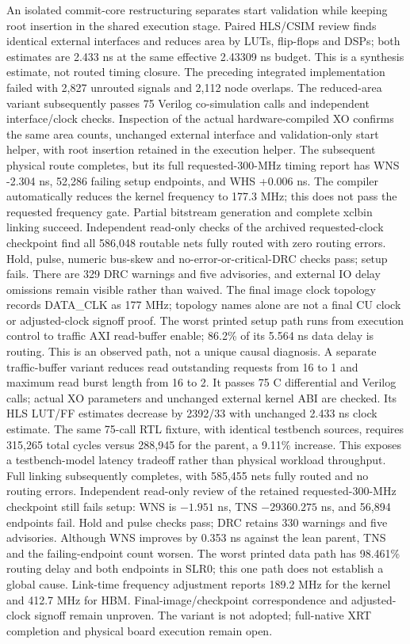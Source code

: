 \documentclass[10pt]{article}
\begin{document}
An isolated commit-core restructuring separates start validation while
keeping root insertion in the shared execution stage. Paired HLS/CSIM
review finds identical external interfaces and reduces area by
\LeanStartLUTDelta{} LUTs, \LeanStartFFDelta{} flip-flops and
\LeanStartDSPDelta{} DSPs; both estimates are 2.433 ns at the same effective
2.43309 ns budget. This is a synthesis estimate, not routed timing closure.
The preceding integrated implementation failed with 2,827 unrouted signals
and 2,112 node overlaps. The reduced-area variant subsequently passes
75 Verilog co-simulation calls and independent interface/clock checks.
Inspection of the actual hardware-compiled XO confirms the same area counts,
unchanged external interface and validation-only start helper, with root
insertion retained in the execution helper. The subsequent physical route
completes, but its full requested-300-MHz timing report has WNS -2.304 ns,
52,286 failing setup endpoints, and WHS +0.006 ns. The compiler automatically
reduces the kernel frequency to 177.3 MHz; this does not pass the requested
frequency gate. Partial bitstream generation and complete xclbin linking
succeed. Independent read-only checks of the archived requested-clock
checkpoint find all 586,048 routable nets fully routed with zero routing
errors. Hold, pulse, numeric bus-skew and no-error-or-critical-DRC checks
pass; setup fails. There are 329 DRC warnings and five advisories, and
external IO delay omissions remain visible rather than waived. The final
image clock topology records DATA\_CLK as 177 MHz; topology names alone
are not a final CU clock or adjusted-clock signoff proof.
The worst printed setup path runs from execution control to traffic AXI
read-buffer enable; 86.2\% of its 5.564 ns data delay is routing. This is
an observed path, not a unique causal diagnosis. A separate traffic-buffer
variant reduces read outstanding requests from 16 to 1 and maximum read
burst length from 16 to 2. It passes 75 C differential and Verilog calls;
actual XO parameters and unchanged external kernel ABI are checked.
Its HLS LUT/FF estimates decrease by 2392/33 with unchanged 2.433 ns clock
estimate. The same 75-call RTL fixture, with identical testbench sources,
requires 315,265 total cycles versus 288,945 for the parent, a 9.11\%
increase. This exposes a testbench-model latency tradeoff rather than
physical workload throughput. Full linking subsequently completes, with
585,455 nets fully routed and no routing errors. Independent read-only
review of the retained requested-300-MHz checkpoint still fails setup:
WNS is $-1.951$ ns, TNS $-29360.275$ ns, and 56,894 endpoints fail.
Hold and pulse checks pass; DRC retains 330 warnings and five advisories.
Although WNS improves by 0.353 ns against the lean parent, TNS and the
failing-endpoint count worsen. The worst printed data path has 98.461\%
routing delay and both endpoints in SLR0; this one path does not establish
a global cause. Link-time frequency adjustment reports 189.2 MHz for the
kernel and 412.7 MHz for HBM. Final-image/checkpoint correspondence and
adjusted-clock signoff remain unproven. The variant is not adopted;
full-native XRT completion and physical board execution remain open.
\end{document}
